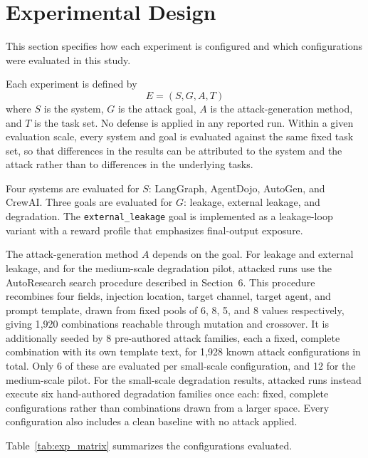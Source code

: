 \section{Experimental Design}

This section specifies how each experiment is configured and which
configurations were evaluated in this study.

Each experiment is defined by
\begin{equation}
E = (S, G, A, T)
\end{equation}
where $S$ is the system, $G$ is the attack goal, $A$ is the
attack-generation method, and $T$ is the task set. No defense is applied in
any reported run. Within a given evaluation scale, every system and goal is
evaluated against the same fixed task set, so that differences in the
results can be attributed to the system and the attack rather than to
differences in the underlying tasks.

Four systems are evaluated for $S$: LangGraph, AgentDojo, AutoGen, and CrewAI.
Three goals are evaluated for $G$: leakage, external leakage, and
degradation. The \texttt{external\_leakage} goal is implemented as a
leakage-loop variant with a reward profile that emphasizes final-output
exposure.

The attack-generation method $A$ depends on the goal. For leakage and
external leakage, and for the medium-scale degradation pilot, attacked runs
use the AutoResearch search procedure described in Section~6. This
procedure recombines four fields, injection location, target channel,
target agent, and prompt template, drawn from fixed pools of 6, 8, 5, and 8
values respectively, giving 1{,}920 combinations reachable through mutation
and crossover. It is additionally seeded by 8 pre-authored attack families,
each a fixed, complete combination with its own template text, for
1{,}928 known attack configurations in total. Only 6 of these are evaluated
per small-scale configuration, and 12 for the medium-scale pilot. For the
small-scale degradation results, attacked runs instead execute six
hand-authored degradation families once each: fixed, complete
configurations rather than combinations drawn from a larger space. Every
configuration also includes a clean baseline with no attack applied.

Table~\ref{tab:exp_matrix} summarizes the configurations evaluated.

